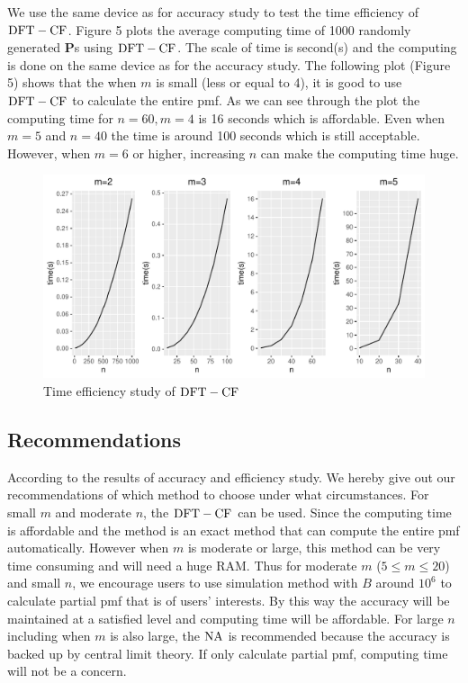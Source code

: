 \documentclass[12pt]{article}
\newcommand{\Pmat}{\mathbf{P}}
\newcommand{\NA}{{\rm NA}}
\newcommand{\dft}{{\rm DFT-CF}}
\begin{document}
We use the same device as for accuracy study to test the time efficiency of $\dft$. Figure 5 plots the average computing time of 1000 randomly generated $\Pmat$s using $\dft$. The scale of time is second(s) and the computing is done on the same device as for the accuracy study. The following plot (Figure 5) shows that the when $m$ is small (less or equal to 4), it is good to use $\dft$ to calculate the entire pmf. As we can see through the plot the computing time for $n=60, m=4$ is 16 seconds which is affordable. Even when $m=5$ and $n=40$ the time is around 100 seconds which is still acceptable. However, when $m=6$ or higher, increasing $n$ can make the computing time huge.
\begin{figure}[h]
	\centering
	\includegraphics[scale=0.7]{figures/effi.pdf}
	\caption{Time efficiency study of $\dft$}
	\label{fig: dft efficiency}
\end{figure}


\subsection{Recommendations}
According to the results of accuracy and efficiency study. We hereby give out our recommendations of which method to choose under what circumstances. For small $m$ and moderate $n$, the $\dft$ can be used. Since the computing time is affordable and the method is an exact method that can compute the entire pmf automatically. However when $m$ is moderate or large, this method can be very time consuming and will need a huge RAM. Thus for moderate $m$ ($5 \leq m \leq 20$) and small $n$, we encourage users to use simulation method with $B$ around $10^6$ to calculate partial pmf that is of users' interests. By this way the accuracy will be maintained at a satisfied level and computing time will be affordable. For large $n$ including when $m$ is also large, the $\NA$ is recommended because the accuracy is backed up by central limit theory. If only calculate partial pmf, computing time will not be a concern.
\end{document}
